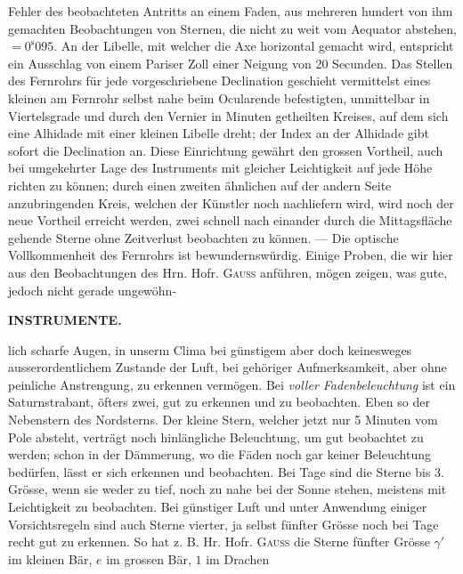 Fehler des beobachteten Antritts an einem Faden, aus mehreren hundert von ihm gemachten Beobachtungen von Sternen, die nicht zu weit vom Aequator
abstehen, $=0^{\mathrm s}095$. An der Libelle,
mit welcher die Axe horizontal gemacht wird, entspricht ein Ausschlag von einem Pariser Zoll einer
Neigung von 20 Secunden. Das Stellen des Fernrohrs für jede vorgeschriebene Declination geschieht
vermittelst eines kleinen am Fernrohr selbst nahe beim Ocularende befestigten, unmittelbar in Viertelsgrade
und durch den Vernier in Minuten getheilten Kreises, auf dem sich eine Alhidade mit einer
kleinen Libelle dreht; der Index an der Alhidade gibt sofort die Declination an. Diese Einrichtung
gewährt den grossen Vortheil, auch bei umgekehrter Lage des Instruments mit gleicher Leichtigkeit
auf jede Höhe richten zu können; durch einen zweiten ähnlichen auf der andern Seite anzubringenden
Kreis, welchen der Künstler noch nachliefern wird, wird noch der neue Vortheil erreicht werden, zwei
schnell nach einander durch die Mittagsfläche gehende Sterne ohne Zeitverlust beobachten zu können. ---
Die optische Vollkommenheit des Fernrohrs ist bewundernswürdig. Einige Proben, die wir hier aus den
Beobachtungen des Hrn. Hofr. \textsc{Gauss} anführen, mögen zeigen, was gute, jedoch nicht gerade ungewöhn-\par
\clearpage
\thispagestyle{empty}
\noindent{}%
\makebox[12mm][l]{}%
\parbox[t]{\dimexpr\linewidth-24mm\relax}{\centering\footnotesize\bfseries INSTRUMENTE.\par}%
\par\nobreak\medskip
\noindent lich scharfe Augen, in unserm Clima bei günstigem aber doch keinesweges ausserordentlichem Zustande
der Luft, bei gehöriger Aufmerksamkeit, aber ohne peinliche Anstrengung, zu erkennen vermögen. Bei
\emph{voller Fadenbeleuchtung} ist ein Saturnstrabant, öfters zwei, gut zu erkennen und zu beobachten.
Eben so der Nebenstern des Nordsterns. Der kleine Stern, welcher jetzt nur 5 Minuten vom Pole absteht,
verträgt noch hinlängliche Beleuchtung, um gut beobachtet zu werden; schon in der Dämmerung, wo die
Fäden noch gar keiner Beleuchtung bedürfen, lässt er sich erkennen und beobachten. Bei Tage sind die
Sterne bis 3. Grösse, wenn sie weder zu tief, noch zu nahe bei der Sonne stehen, meistens mit
Leichtigkeit zu beobachten. Bei günstiger Luft und unter Anwendung einiger Vorsichtsregeln sind auch
Sterne vierter, ja selbst fünfter Grösse noch bei Tage recht gut zu erkennen. So hat z. B. Hr. Hofr.
\textsc{Gauss} die Sterne fünfter Grösse $\gamma'$ im kleinen Bär, $e$ im grossen Bär, $1$ im Drachen
